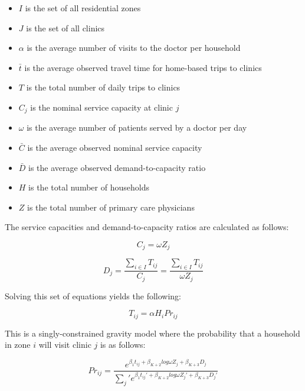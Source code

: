 \documentclass[]{elsarticle} %
\providecommand{\tightlist}{%
  \setlength{\itemsep}{0pt}\setlength{\parskip}{0pt}}
\begin{document}
\begin{itemize}
\tightlist
\item
  \(I\) is the set of all residential zones
\item
  \(J\) is the set of all clinics
\item
  \(\alpha\) is the average number of visits to the doctor per household
\item
  \(\bar{t}\) is the average observed travel time for home-based trips
  to clinics
\item
  \(T\) is the total number of daily trips to clinics
\item
  \(C_j\) is the nominal service capacity at clinic \(j\)
\item
  \(\omega\) is the average number of patients served by a doctor per
  day
\item
  \(\bar{C}\) is the average observed nominal service capacity
\item
  \(\bar{D}\) is the average observed demand-to-capacity ratio
\item
  \(H\) is the total number of households
\item
  \(Z\) is the total number of primary care physicians
\end{itemize}

The service capacities and demand-to-capacity ratios are calculated as
follows:

\begin{equation}
\label{eq:mnl_C_j}
C_j = \omega Z_j
\end{equation}

\begin{equation}
\label{eq:mnl_D_j}
D_j = \frac{\sum_{i \in I} T_{ij}}{C_j} = \frac{\sum_{i \in I} T_{ij}}{\omega Z_j}
\end{equation}

\noindent Solving this set of equations yields the following:

\begin{equation}
\label{eq:mnl_T_ij_specific}
T_{ij} = \alpha H_i Pr_{ij}
\end{equation}

\noindent This is a singly-constrained gravity model where the
probability that a household in zone \(i\) will visit clinic \(j\) is as
follows:

\begin{equation}
\label{eq:mnl_Pr}
Pr_{ij} = \frac{e^{\beta_1 t_{ij} + \beta_{K+2} log \omega Z_j + \beta_{K + 3} D_j}}{\sum_j\prime e^{\beta_1 t_{ij}\prime + \beta_{K+2} log \omega Z_j\prime + \beta_{K + 3} D_j\prime}}
\end{equation}
\end{document}
